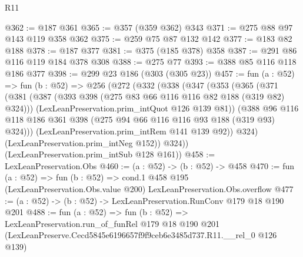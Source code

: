 \begin{lexlean}{R11}
\begin{coremodule}
@362 := @187 @361
@365 := @357 (@359 @362) @343
@371 := @275 @88 @97 @143 @119 @358 @362
@375 := @259 @75 @87 @132 @142
@377 := @183 @82 @188
@378 := @187 @377
@381 := @375 (@185 @378) @358
@387 := @291 @86 @116 @119 @184 @378 @308
@388 := @275 @77
@393 := @388 @85 @116 @118 @186 @377
@398 := @299 @23 @186 (@303 (@305 @23))
@457 := fun (a : @52) =>
  fun (b : @52) =>
  @256
    (@272
      (@332
        (@338
          (@347
            (@353
              (@365
                (@371
                  (@381
                    (@387 (@393 @398 (@275 @83 @66 @116 @116 @82 @188 (@319 @82) @324)))
                    (LexLeanPreservation.prim_intQuot @126 @139 @81))
                  (@388
                    @96
                    @116
                    @118
                    @186
                    @361
                    @398
                    (@275 @94 @66 @116 @116 @93 @188 (@319 @93) @324)))
                (LexLeanPreservation.prim_intRem @141 @139 @92))
              @324)
            (LexLeanPreservation.prim_intNeg @152))
          @324))
      (LexLeanPreservation.prim_intSub @128 @161))
@458 := LexLeanPreservation.Obs
@460 := (a : @52) -> (b : @52) -> @458
@470 := fun (a : @52) =>
  fun (b : @52) =>
  cond.{1} @458 @195 (LexLeanPreservation.Obs.value @200) LexLeanPreservation.Obs.overflow
@477 := (a : @52) -> (b : @52) -> LexLeanPreservation.RunConv @179 @18 @190 @201
@488 := fun (a : @52) =>
  fun (b : @52) =>
  LexLeanPreservation.run_of_funRel
    @179
    @18
    @190
    @201
    (LexLeanPreserve.Cecd5845e6196657f9f9ceb6e3485d737.R11.__rel_0 @126 @139)
\end{coremodule}
\end{lexlean}
